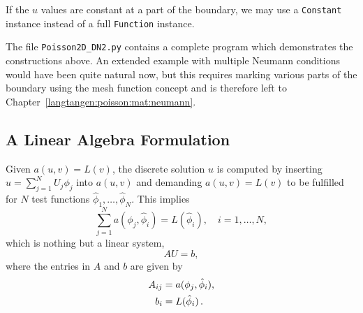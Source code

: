 If the $u$ values are constant at a part of the boundary, we may use
a {\fontsize{12pt}{12pt}\texttt{Constant}} instance instead of a full {\fontsize{12pt}{12pt}\texttt{Function}} instance.

The file {\fontsize{12pt}{12pt}\verb!Poisson2D_DN2.py!} contains a complete program which
demonstrates the constructions above.
An extended example with multiple Neumann conditions would have
been quite natural now, but this requires marking various parts
of the boundary using the mesh function concept and is therefore
left to Chapter~\ref{langtangen:poisson:mat:neumann}.


\subsection{A Linear Algebra Formulation}
\label{langtangen:poisson1:linalg}

Given $a(u,v)=L(v)$, the discrete solution $u$ is computed by
inserting $u=\sum_{j=1}^N U_j \phi_j$ into $a(u,v)$ and demanding
$a(u,v)=L(v)$ to be fulfilled for $N$ test functions
$\hat\phi_1,\ldots,\hat\phi_N$. This implies
\[ \sum_{j=1}^N a(\phi_j,\hat\phi_i) = L(\hat\phi_i),\quad i=1,\ldots,N,\]
which is nothing but a linear system,
\begin{displaymath}
  AU = b,
\end{displaymath}
where the entries in $A$ and $b$ are given by
\begin{displaymath}
\begin{split}
  A_{ij} &= a(\phi_j, \hat{\phi}_i), \\
  b_i &= L(\hat\phi_i)\thinspace .
\end{split}
\end{displaymath}

